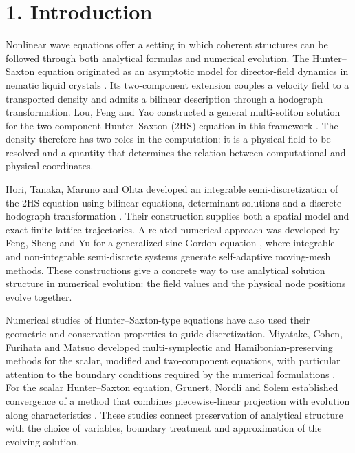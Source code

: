 \documentclass[11pt,a4paper]{article}
\begin{document}
\FloatBarrier
\section*{1. Introduction}

Nonlinear wave equations offer a setting in which coherent structures can be followed through both analytical formulas and numerical evolution. The Hunter--Saxton equation originated as an asymptotic model for director-field dynamics in nematic liquid crystals \cite{hunter1991}. Its two-component extension couples a velocity field to a transported density and admits a bilinear description through a hodograph transformation. Lou, Feng and Yao constructed a general multi-soliton solution for the two-component Hunter--Saxton (2HS) equation in this framework \cite{lou2016}. The density therefore has two roles in the computation: it is a physical field to be resolved and a quantity that determines the relation between computational and physical coordinates.

Hori, Tanaka, Maruno and Ohta developed an integrable semi-discretization of the 2HS equation using bilinear equations, determinant solutions and a discrete hodograph transformation \cite{hori2026}. Their construction supplies both a spatial model and exact finite-lattice trajectories. A related numerical approach was developed by Feng, Sheng and Yu for a generalized sine-Gordon equation \cite{feng2023}, where integrable and non-integrable semi-discrete systems generate self-adaptive moving-mesh methods. These constructions give a concrete way to use analytical solution structure in numerical evolution: the field values and the physical node positions evolve together.

Numerical studies of Hunter--Saxton-type equations have also used their geometric and conservation properties to guide discretization. Miyatake, Cohen, Furihata and Matsuo developed multi-symplectic and Hamiltonian-preserving methods for the scalar, modified and two-component equations, with particular attention to the boundary conditions required by the numerical formulations \cite{miyatake2017}. For the scalar Hunter--Saxton equation, Grunert, Nordli and Solem established convergence of a method that combines piecewise-linear projection with evolution along characteristics \cite{grunert2021}. These studies connect preservation of analytical structure with the choice of variables, boundary treatment and approximation of the evolving solution.
\end{document}
